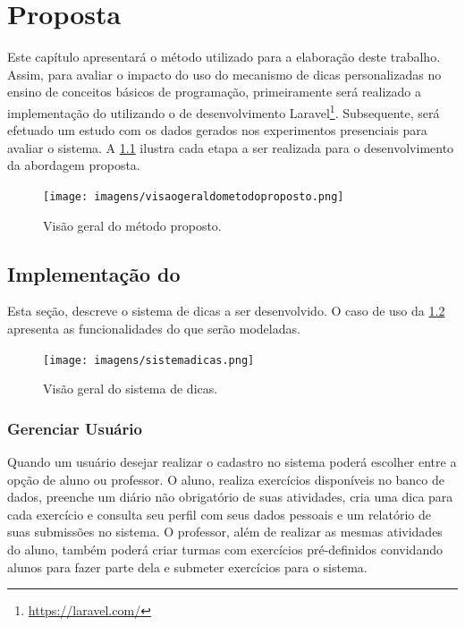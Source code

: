 \chapter{Proposta}

Este capítulo apresentará o método utilizado para a elaboração deste trabalho. Assim, para avaliar o impacto do uso do mecanismo de dicas personalizadas no ensino de conceitos básicos de programação, primeiramente será realizado a implementação do  utilizando o  de desenvolvimento Laravel\footnote{\url{https://laravel.com/}}. Subsequente, será efetuado um estudo com os dados gerados nos experimentos presenciais para avaliar o sistema. A \cref{figura:visaometodo} ilustra cada etapa a ser realizada para o desenvolvimento da abordagem proposta.

\begin{figure}[h]
	\captionsetup{justification=centering}
	\texttt{[image: imagens/visaogeraldometodoproposto.png]}
	\caption{Visão geral do método proposto.}
	\label{figura:visaometodo}
\end{figure}

\section{Implementação do }

Esta seção, descreve o sistema de dicas a ser desenvolvido. O caso de uso da \cref{figura:sistemadicas} apresenta as funcionalidades do  que serão modeladas.

\begin{figure}[h]
	\centering
	\captionsetup{justification=centering}
	\texttt{[image: imagens/sistemadicas.png]}
	\caption{Visão geral do sistema de dicas.}
	\label{figura:sistemadicas}
\end{figure}

\subsection{Gerenciar Usuário}

Quando um usuário desejar realizar o cadastro no sistema poderá escolher entre a opção de aluno ou professor. O aluno, realiza exercícios disponíveis no banco de dados, preenche um diário não obrigatório de suas atividades, cria uma dica para cada exercício e consulta seu perfil com seus dados pessoais e um relatório de suas submissões no sistema. O professor, além de realizar as mesmas atividades do aluno, também poderá criar turmas com exercícios pré-definidos convidando alunos para fazer parte dela e submeter exercícios para o sistema. 

